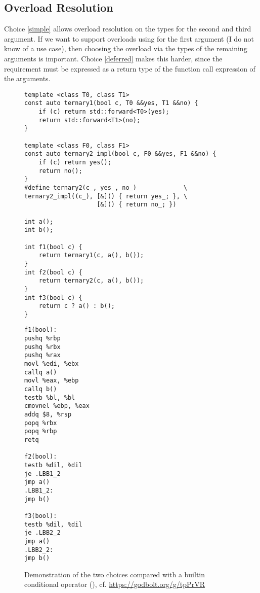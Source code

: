 \subsection{Overload Resolution}
Choice \ref{simple} allows overload resolution on the types for the second and third argument.
If we want to support overloads using \bool for the first argument (I do not know of a use case), then choosing the overload via the types of the remaining arguments is important.
Choice \ref{deferred} makes this harder, since the requirement must be expressed as a return type of the function call expression of the arguments.

\begin{figure}
  \centering
  \begin{minipage}[t]{.7\linewidth}
    \begin{lstlisting}[style=Vc]
template <class T0, class T1>
const auto ternary1(bool c, T0 &&yes, T1 &&no) {
    if (c) return std::forward<T0>(yes);
    return std::forward<T1>(no);
}

template <class F0, class F1>
const auto ternary2_impl(bool c, F0 &&yes, F1 &&no) {
    if (c) return yes();
    return no();
}
#define ternary2(c_, yes_, no_)             \
ternary2_impl((c_), [&]() { return yes_; }, \
                    [&]() { return no_; })

int a();
int b();

int f1(bool c) {
    return ternary1(c, a(), b());
}
int f2(bool c) {
    return ternary2(c, a(), b());
}
int f3(bool c) {
    return c ? a() : b();
}
    \end{lstlisting}
  \end{minipage}\hfill%
  \begin{minipage}[t]{.25\linewidth}
    \begin{lstlisting}[language={}]
f1(bool):
pushq %rbp
pushq %rbx
pushq %rax
movl %edi, %ebx
callq a()
movl %eax, %ebp
callq b()
testb %bl, %bl
cmovnel %ebp, %eax
addq $8, %rsp
popq %rbx
popq %rbp
retq

f2(bool):
testb %dil, %dil
je .LBB1_2
jmp a()
.LBB1_2:
jmp b()

f3(bool):
testb %dil, %dil
je .LBB2_2
jmp a()
.LBB2_2:
jmp b()
    \end{lstlisting}
  \end{minipage}
  \caption{Demonstration of the two choices compared with a builtin conditional operator (), cf. \url{https://godbolt.org/g/tpPrVR}}
  \label{fig:demo}
\end{figure}

